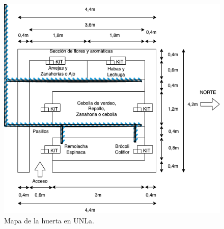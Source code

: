 \begin{figure}[htpb]
\centering 
\includegraphics[width=.7\textwidth]{./Figures/despliegue.png}
\caption{Mapa de la huerta en UNLa.}
\label{fig:diagBloques}
\end{figure}


